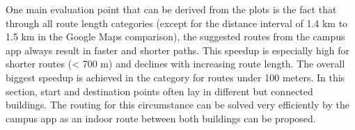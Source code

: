 One main evaluation point that can be derived from the plots is the fact that through all route length categories (except for the distance interval of 1.4 km to 1.5 km in the Google Maps comparison), the suggested routes from the campus app always result in faster and shorter paths. This speedup is especially high for shorter routes (< 700 m) and declines with increasing route length. The overall biggest speedup is achieved in the category for routes under 100 meters. In this section, start and destination points often lay in different but connected buildings. The routing for this circumstance can be solved very efficiently by the campus app as an indoor route between both buildings can be proposed.

